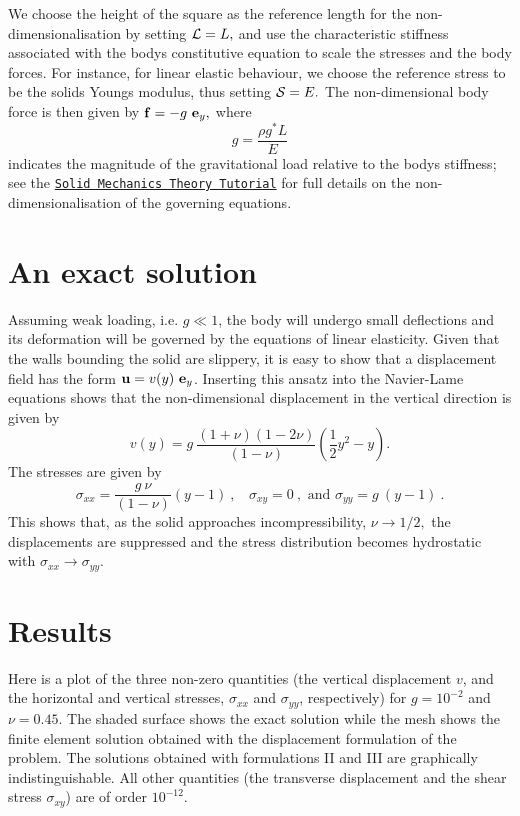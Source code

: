 We choose the height of the square as the reference length for the non-\/dimensionalisation by setting $ {\cal L} = L, $ and use the characteristic stiffness associated with the body\textquotesingle{}s constitutive equation to scale the stresses and the body forces. For instance, for linear elastic behaviour, we choose the reference stress to be the solid\textquotesingle{}s Young\textquotesingle{}s modulus, thus setting $ {\cal S} = E. $ The non-\/dimensional body force is then given by $ {\bf f} = - g \ {\bf e}_y, $ where \[ g = \frac{\rho g^* L}{E} \] indicates the magnitude of the gravitational load relative to the body\textquotesingle{}s stiffness; see the \href{../../solid_theory/html/index.html#non-dim_solid}{\tt Solid Mechanics Theory Tutorial} for full details on the non-\/dimensionalisation of the governing equations.



 

\hypertarget{index_exact}{}\section{An exact solution}\label{index_exact}
Assuming weak loading, i.\+e. $ g \ll 1 $, the body will undergo small deflections and its deformation will be governed by the equations of linear elasticity. Given that the walls bounding the solid are slippery, it is easy to show that a displacement field has the form $ {\bf u} = v(y)\ {\bf e}_y $. Inserting this ansatz into the Navier-\/\+Lame equations shows that the non-\/dimensional displacement in the vertical direction is given by \[ v(y) = g \ \frac{(1+\nu)(1-2\nu)}{(1-\nu)} \left( \frac{1}{2} y^2 - y \right). \] The stresses are given by \[ \sigma_{xx} = \frac{g \ \nu}{(1-\nu)} (y-1) \ , \ \ \ \ \sigma_{xy} = 0 \ , \mbox{ \ \ \ and \ \ \ } \sigma_{yy} = g \ (y-1) \ . \] This shows that, as the solid approaches incompressibility, $ \nu \to 1/2, $ the displacements are suppressed and the stress distribution becomes hydrostatic with $ \sigma_{xx} \to \sigma_{yy}. $



 

\hypertarget{index_results}{}\section{Results}\label{index_results}
Here is a plot of the three non-\/zero quantities (the vertical displacement $ v $, and the horizontal and vertical stresses, $ \sigma_{xx} $ and $ \sigma_{yy} $, respectively) for $ g = 10^{-2} $ and $ \nu =0.45. $ The shaded surface shows the exact solution while the mesh shows the finite element solution obtained with the displacement formulation of the problem. The solutions obtained with formulations II and I\+II are graphically indistinguishable. All other quantities (the transverse displacement and the shear stress $ \sigma_{xy} $) are of order $ 10^{-12}. $

